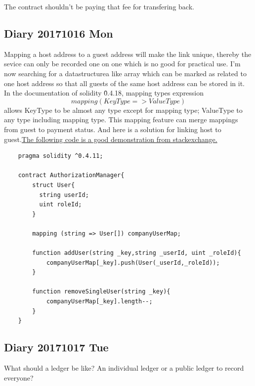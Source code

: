     
The contract shouldn't be paying that fee for transfering back. 



\subsection{Diary 20171016 Mon}
Mapping a host address to a guest address will make the link unique, thereby the sevice can only be recorded one on one which is no good for practical use.
I'm now searching for a datastructurea like array which can be marked as related to one host address so that all guests of the same host address can be stored in it.
In the documentation of solidity \^0.4.18, mapping types expression $$mapping(KeyType => ValueType)$$
allows KeyType to be almost any type except for mapping type; ValueType to any type including mapping type.
This mapping feature can merge mappings from guest to payment status.
And here is a solution for linking host to guest.\href{https://ethereum.stackexchange.com/questions/27053/how-to-create-a-mapping-of-string-and-struct-array-in-solidity}{The following code is a good demonstration from stackexchange.}
\begin{lstlisting}
    pragma solidity ^0.4.11;
    
    contract AuthorizationManager{
        struct User{
          string userId;
          uint roleId;
        }
    
        mapping (string => User[]) companyUserMap;
    
        function addUser(string _key,string _userId, uint _roleId){
            companyUserMap[_key].push(User(_userId,_roleId));
        }
    
        function removeSingleUser(string _key){
            companyUserMap[_key].length--;
        }
    }
\end{lstlisting}
\subsection{Diary 20171017 Tue}
What should a ledger be like?
An individual ledger or a public ledger to record everyone?
